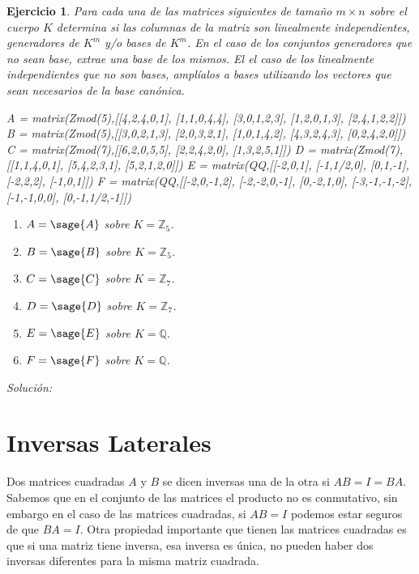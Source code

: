 \documentclass{amsart}
\newtheorem{ejer}{Ejercicio}
\begin{document}
\begin{ejer}
Para cada una de las matrices siguientes de tamaño $m \times n$ sobre el 
cuerpo $K$ determina si las columnas de la matriz son linealmente 
independientes, generadores de $K^m$ y/o bases de $K^m$. En el caso de 
los conjuntos generadores que no sean base, extrae una base de los mismos.
El el caso de los linealmente independientes que no son bases, amplíalos a
bases utilizando los vectores que sean necesarios de la base canónica.

\begin{sagecode}
A = matrix(Zmod(5),[[4,2,4,0,1],
[1,1,0,4,4],
[3,0,1,2,3],
[1,2,0,1,3],
[2,4,1,2,2]])
B = matrix(Zmod(5),[[3,0,2,1,3],
[2,0,3,2,1],
[1,0,1,4,2],
[4,3,2,4,3],
[0,2,4,2,0]])
C = matrix(Zmod(7),[[6,2,0,5,5],
[2,2,4,2,0],
[1,3,2,5,1]])
D = matrix(Zmod(7),[[1,1,4,0,1],
[5,4,2,3,1],
[5,2,1,2,0]])
E = matrix(QQ,[[-2,0,1],
[-1,1/2,0],
[0,1,-1],
[-2,2,2],
[-1,0,1]])
F = matrix(QQ,[[-2,0,-1,2],
[-2,-2,0,-1],
[0,-2,1,0],
[-3,-1,-1,-2],
[-1,-1,0,0],
[0,-1,1/2,-1]])
\end{sagecode}

\begin{enumerate}
\item $ A = \sage{A}$ sobre $K = {\mathbb Z}_5$.
\item $ B = \sage{B}$ sobre $K = {\mathbb Z}_5$.
\item $ C = \sage{C}$ sobre $K = {\mathbb Z}_7$.
\item $ D = \sage{D}$ sobre $K = {\mathbb Z}_7$.
\item $ E = \sage{E}$ sobre $K = {\mathbb Q}$.
\item $ F = \sage{F}$ sobre $K = {\mathbb Q}$.
\end{enumerate}
\end{ejer}
{\it Solución:}




\section{Inversas Laterales}

Dos matrices cuadradas $A$ y $B$ se dicen inversas una de la otra si 
$AB = I = BA$. Sabemos que en el conjunto de las matrices el producto
no es conmutativo, sin embargo en el caso de las matrices cuadradas, si
$AB = I$ podemos estar seguros de que $BA = I$. Otra propiedad importante
que tienen las matrices cuadradas es que si una matriz tiene inversa, 
esa inversa es única, no pueden haber dos inversas diferentes para la 
misma matriz cuadrada.
\end{document}
